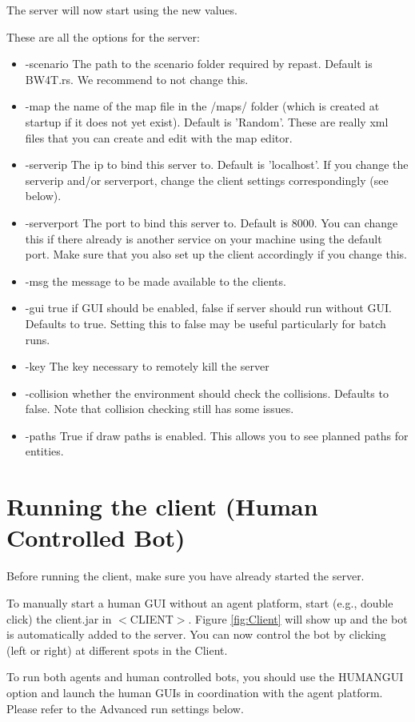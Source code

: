 \documentclass[11pt,a4paper]{article}
\begin{document}
The server will now start using the new values.

These are all the  options for the server:
\begin{itemize}
\item -scenario The path to the scenario folder required by repast. Default is BW4T.rs. We recommend to not change this.  
\item -map the name of the map file in the /maps/ folder (which is created at startup if it does not yet exist). Default is 'Random'. These are really xml files that you can create and edit with the map editor.
\item -serverip The ip to bind this server to. Default is 'localhost'. If you change the serverip and/or serverport, change the client settings correspondingly (see below). 
\item -serverport  The port to bind this server to. Default is 8000. You can change this if there already is another service on your machine using the default port. Make sure that you also set up the client accordingly if you change this.
\item -msg the message to be made available to the clients.
\item -gui true if GUI should be enabled, false if server should run without GUI. Defaults to true. Setting this to false  may be useful particularly for batch runs.
\item -key The key necessary to remotely kill the server
\item -collision whether the environment should check the collisions. Defaults to false. Note that collision checking still has some issues.
\item -paths True if draw paths is enabled. This allows you to see planned paths for entities.
\end{itemize}

\section{Running the client (Human Controlled Bot)}
Before running the client, make sure you have already started the server. 

To manually start a human GUI without an agent platform, start (e.g., double click) the client.jar in $<$CLIENT$>$. Figure \ref{fig:Client} will show up and the bot is automatically added to the server. You can now control the bot by clicking (left or right) at different spots in the Client. 

To run both agents and human controlled bots, you should use the HUMANGUI option and launch the human GUIs in coordination with the agent platform. Please refer to the Advanced run settings below.
\end{document}
